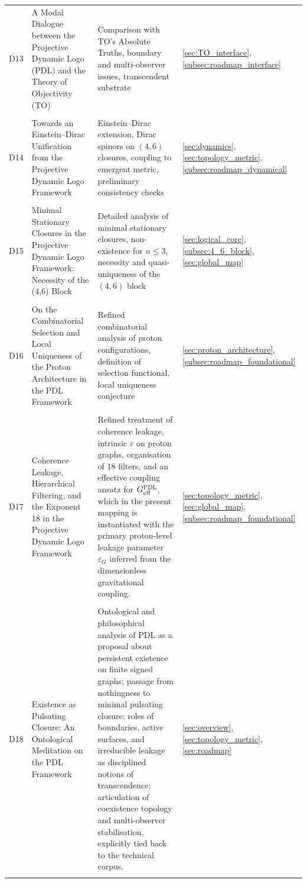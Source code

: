 \documentclass[11pt,a4paper]{article}
\newcommand{\PDL}{\textnormal{PDL}}
\begin{document}
\begin{longtable}{@{}p{0.9cm}L{5cm}L{6.5cm}L{2.4cm}@{}}
  D13 &
  A Modal Dialogue between the Projective Dynamic Logo (PDL) and the Theory of Objectivity (TO) &
  Comparison with TO's Absolute Truths, boundary and multi-observer issues, transcendent substrate &
  \ref{sec:TO_interface}, \ref{subsec:roadmap_interface} \\\\[0.4em]

  D14 &
  Towards an Einstein--Dirac Unification from the Projective Dynamic Logo Framework &
  Einstein–Dirac extension, Dirac spinors on $(4,6)$ closures, coupling to emergent metric, preliminary consistency checks &
  \ref{sec:dynamics}, \ref{sec:topology_metric}, \ref{subsec:roadmap_dynamical} \\\\[0.4em]

  D15 &
  Minimal Stationary Closures in the Projective Dynamic Logo Framework: Necessity of the (4,6) Block &
  Detailed analysis of minimal stationary closures, non-existence for $n \leq 3$, necessity and quasi-uniqueness of the $(4,6)$ block &
  \ref{sec:logical_core}, \ref{subsec:4_6_block}, \ref{sec:global_map} \\\\[0.4em]

  D16 &
  On the Combinatorial Selection and Local Uniqueness of the Proton Architecture in the PDL Framework &
  Refined combinatorial analysis of proton configurations, definition of selection functional, local uniqueness conjecture &
  \ref{sec:proton_architecture}, \ref{subsec:roadmap_foundational} \\\\[0.4em]

  D17 &
  Coherence Leakage, Hierarchical Filtering, and the Exponent 18 in the Projective Dynamic Logo Framework &
  Refined treatment of coherence leakage, intrinsic $\varepsilon$ on proton graphs, organisation of 18 filters, and an effective coupling ansatz for $G_{\mathrm{eff}}^{\PDL}$, which in the present mapping is instantiated with the primary proton-level leakage parameter $\varepsilon_G$ inferred from the dimensionless gravitational coupling.
 &
  \ref{sec:topology_metric}, \ref{sec:global_map}, \ref{subsec:roadmap_foundational} \\\\[0.4em] 

  D18 & 
  Existence as Pulsating Closure: An Ontological Meditation on the PDL Framework & Ontological and philosophical analysis of PDL as a proposal about persistent existence on finite signed graphs; passage from nothingness to minimal pulsating closure; roles of boundaries, active surfaces, and irreducible leakage as disciplined notions of transcendence; articulation of coexistence topology and multi-observer stabilisation, explicitly tied back to the technical corpus. & 
  \ref{sec:overview}, \ref{sec:topology_metric}, \ref{sec:roadmap} \\\\[0.4em] 
  

\end{longtable}
\end{document}
